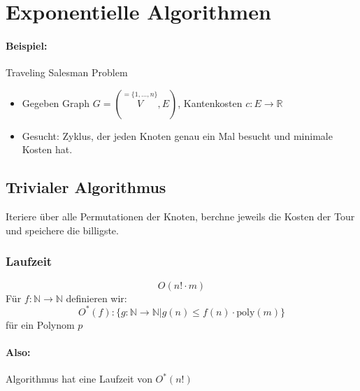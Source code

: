 
\section{Exponentielle Algorithmen}
\paragraph{Beispiel:}
Traveling Salesman Problem
\begin{figure}[H]
	\centering
\end{figure}
\begin{itemize}
	\item Gegeben Graph $G=(\overset{=\{1,\ldots,n \}}{V},E)$, Kantenkosten $c:E\rightarrow \mathbb{R}$
	\item Gesucht: Zyklus, der jeden Knoten genau ein Mal besucht und minimale Kosten hat.
\end{itemize}
\subsection{Trivialer Algorithmus}
Iteriere über alle Permutationen der Knoten, berchne jeweils die Kosten der Tour und speichere die billigste.
\subsubsection{Laufzeit}
\[ O(n!\cdot m) \]
Für $f:\mathbb{N}\rightarrow\mathbb{N}$ definieren wir:
\[ O^*(f) : \{ g:\mathbb{N}\rightarrow\mathbb{N} | g(n) \leq f(n)\cdot \text{poly}(m) \} \]
für ein Polynom $p$\\
\paragraph{Also:}
Algorithmus hat eine Laufzeit von $O^*(n!)$\\
